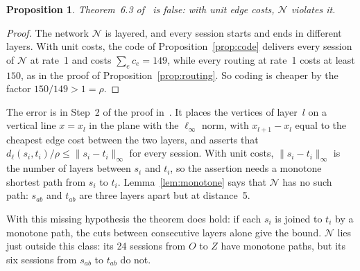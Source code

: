 \documentclass[11pt]{article}
\newtheorem{proposition}[theorem]{Proposition}
\begin{document}
\begin{proposition}\label{prop:layered}
Theorem~6.3 of~\cite{XLWH14} is false: with unit edge costs, $\mathcal N$ violates it.
\end{proposition}

\begin{proof}
The network $\mathcal N$ is layered, and every session starts and ends in different layers. With unit costs, the code of Proposition~\ref{prop:code} delivers every session of $\mathcal N$ at rate~1 and costs $\sum_e c_e=149$, while every routing at rate~1 costs at least $150$, as in the proof of Proposition~\ref{prop:routing}. So coding is cheaper by the factor $150/149>1=\rho$.
\end{proof}

The error is in Step~2 of the proof in~\cite{XLWH14}. It places the vertices of layer~$l$ on a vertical line $x=x_l$ in the plane with the $\ell_\infty$ norm, with $x_{l+1}-x_l$ equal to the cheapest edge cost between the two layers, and asserts that $d_\ell(s_i,t_i)/\rho\le\lVert s_i-t_i\rVert_\infty$ for every session. With unit costs, $\lVert s_i-t_i\rVert_\infty$ is the number of layers between $s_i$ and $t_i$, so the assertion needs a monotone shortest path from $s_i$ to $t_i$. Lemma~\ref{lem:monotone} says that $\mathcal N$ has no such path: $s_{ab}$ and $t_{ab}$ are three layers apart but at distance~5.

With this missing hypothesis the theorem does hold: if each $s_i$ is joined to $t_i$ by a monotone path, the cuts between consecutive layers alone give the bound. $\mathcal N$ lies just outside this class: its 24 sessions from $O$ to $Z$ have monotone paths, but its six sessions from $s_{ab}$ to $t_{ab}$ do not.
\end{document}

